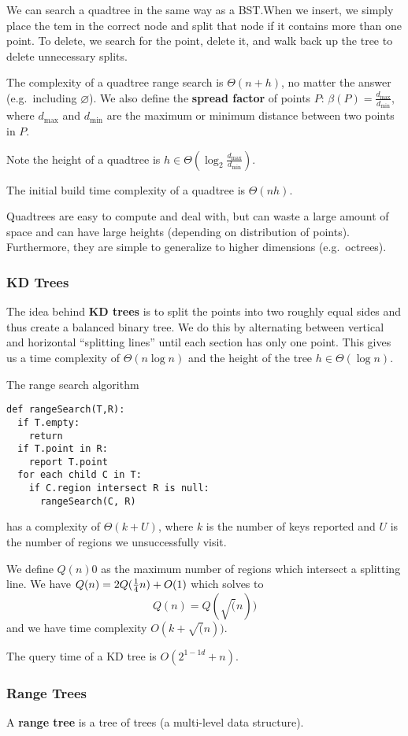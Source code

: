 \documentclass[12pt]{article}
\begin{document}
We can search a quadtree in the same way as a BST.\@ When we insert, we simply place the tem in the correct node and split that node if it contains more than one point. To delete, we search for the point, delete it, and walk back up the tree to delete unnecessary splits.

The complexity of a quadtree range search is $\Theta(n + h)$, no matter the answer (e.g.\ including $\varnothing$). We also define the {\bf spread factor} of points $P$: $\beta(P) = \frac{d_{\max}}{d_{\min}}$, where $d_{\max}$ and $d_{\min}$ are the maximum or minimum distance between two points in $P$.

Note the height of a quadtree is $h \in \Theta(\log_2 \frac{d_{\max}}{d_{\min}})$.

The initial build time complexity of a quadtree is $\Theta(nh)$.

Quadtrees are easy to compute and deal with, but can waste a large amount of space and can have large heights (depending on distribution of points). Furthermore, they are simple to generalize to higher dimensions (e.g.\ octrees).

\subsubsection{KD Trees}
The idea behind {\bf KD trees} is to split the points into two roughly equal sides and thus create a balanced binary tree. We do this by alternating between vertical and horizontal ``splitting lines'' until each section has only one point. This gives us a time complexity of $\Theta(n\log n)$ and the height of the tree $h\in \Theta(\log n)$.

The range search algorithm
\begin{verbatim}
def rangeSearch(T,R):
  if T.empty:
    return
  if T.point in R:
    report T.point
  for each child C in T:
    if C.region intersect R is null:
      rangeSearch(C, R)
\end{verbatim}
has a complexity of $\Theta(k + U)$, where $k$ is the number of keys reported and $U$ is the number of regions we unsuccessfully visit.

We define $Q(n)0$ as the maximum number of regions which intersect a splitting line. We have $Q(n) = 2Q(\frac{1}{4} n) + O(1)$ which solves to \[ Q(n) = Q(\sqrt(n)) \] and we have time complexity $O(k + \sqrt(n))$.

The query time of a KD tree is $O(2^{1-1d} + n)$. %

\subsubsection{Range Trees}
A {\bf range tree} is a tree of trees (a multi-level data structure).

\end{document}
